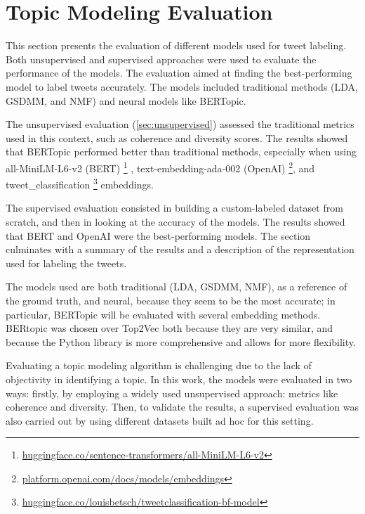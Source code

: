 \section{Topic Modeling Evaluation}

    \graphicspath{{Chapter4/Figures}{Chapter4/Figures}}

This section presents the evaluation of different models used for tweet labeling. Both unsupervised and supervised approaches were used to evaluate the performance of the models. The evaluation aimed at finding the best-performing model to label tweets accurately. The models included traditional methods (LDA, GSDMM, and NMF) and neural models like BERTopic.

The unsupervised evaluation (\ref{sec:unsupervised}) assessed the traditional metrics used in this context, such as coherence and diversity scores. The results showed that BERTopic performed better than traditional methods, especially when using all-MiniLM-L6-v2 (BERT) \footnote{\href{https://huggingface.co/sentence-transformers/all-MiniLM-L6-v2}{huggingface.co/sentence-transformers/all-MiniLM-L6-v2}}
, text-embedding-ada-002 (OpenAI) \footnote{\href{https://platform.openai.com/docs/models/embeddings}{platform.openai.com/docs/models/embeddings}},
and tweet\_classification \footnote{\href{https://huggingface.co/louisbetsch/tweetclassification-bf-model}{huggingface.co/louisbetsch/tweetclassification-bf-model}} embeddings. 


The supervised evaluation consisted in building a custom-labeled dataset from scratch, and then in looking at the accuracy of the models. The results showed that BERT and OpenAI were the best-performing models. The section culminates with a summary of the results and a description of the representation used for labeling the tweets.

The models used are both traditional (LDA, GSDMM, NMF), as a reference of the ground truth, and neural, because they seem to be the most accurate; in particular, BERTopic will be evaluated with several embedding methods.  BERtopic was chosen over Top2Vec both because they are very similar, and because the Python library is more comprehensive and allows for more flexibility.

Evaluating a topic modeling algorithm is challenging due to the lack of objectivity in identifying a topic. In this work, the models were evaluated in two ways: firstly, by employing a widely used unsupervised approach: metrics like coherence and diversity. Then, to validate the results, a supervised evaluation was also carried out by using different datasets built ad hoc for this setting.

